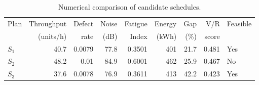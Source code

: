 \begin{table}[htbp]
\centering
\caption{Numerical comparison of candidate schedules.}
\label{tab:numerical-sim}
\small
\begin{tabular}{@{}lrrrrrrrl@{}}
\toprule
Plan & Throughput & Defect & Noise & Fatigue & Energy & Gap & V/R & Feasible \\
     & (units/h)  & rate   & (dB)  & Index   & (kWh)  & (\%) & score &         \\
\midrule
$S_{1}$ & 40.7 & 0.0079 & 77.8 & 0.3501 & 401 & 21.7 & 0.481 & Yes \\
$S_{2}$ & 48.2 & 0.01 & 84.9 & 0.6001 & 462 & 25.9 & 0.467 & No \\
$S_{3}$ & 37.6 & 0.0078 & 76.9 & 0.3611 & 413 & 42.2 & 0.423 & Yes \\
\bottomrule
\end{tabular}
\end{table}
